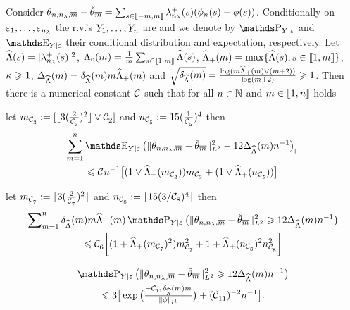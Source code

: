 \begin{lm}\label{au:re:rest}
Consider  
$\hxdfPr-\dxdfPr=\sum_{s\in\nset{-\Di,\Di}}\hfedfmpI[(s)](\hfydf[(s)]-\fydf[(s)])$.
Conditionally on $\rE_1,\dotsc,\rE_{\ssE}$ the r.v.'s
$\rY_1,\dotsc,\rY_{\ssY}$ are \iid and we  denote by $\P_{Y \vert \epsilon}$ and $\E_{Y \vert \epsilon}$ their conditional
 distribution and expectation, respectively. 
Let $\eiSv[(s)]=\vert\hfedfmpI[(s)]\vert^2$,
$\oeiSv=\tfrac{1}{\Di}\sum_{s\in\nset{1,\Di}}\eiSv[(s)]$, $\meiSv=
  \max\{\eiSv[(s)],s\in\nset{1,\Di}\}$, $\cpen\geq1$, $\DiepenSv=\cmeiSv\Di \meiSv$
 and $\sqrt{\cmeiSv}=\tfrac{\log (\Di\meiSv \vee (\Di+2))}{\log(\Di+2)}\geq1$.  Then there is a numerical constant $\cst{}$ such
 that for all $\ssY\in\Nz$ and $\Di\in\nset{1,\ssY}$ holds
  \begin{resListeN}[]
  \item\label{au:re:rest:i} let $\Di_{\cst{3}}:=[\floor{3(\tfrac{2}{\cst{3}})^2}\vee \cst{2}]$ and $\ssY_{\cst{5}}:=15(\tfrac{1}{\cst{5}})^4$ then\\ 
    \begin{multline*}
    \sum_{\Di=1}^{\ssY}\E_{Y\vert \epsilon} \vectp{\VnormLp{\hxdfPr-\dxdfPr}^2 - 12\DiepenSv\ssY^{-1}}\\
 \leq \cst{}\ssY^{-1}\big[(1\vee\meiSv[\Di_{\cst{3}}])\Di_{\cst{3}}+(1\vee\meiSv[\ssY_{\cst{5}}])\big]
 \end{multline*}
  \item\label{au:re:rest:ii} let
    $\Di_{\cst{7}}:=\floor{3(\tfrac{2}{\cst{7}})^2}$ and
    $\ssY_{\cst{8}}:=\floor{15({3/\cst{8}})^4}$ then\\
    \begin{multline*}
    \sum\nolimits_{\Di=1}^{\ssY}\cmeiSv \Di \meiSv\P_{Y \vert \epsilon}\big(\VnormLp{\hxdfPr-\dxdfPr}^2 \geq 12\DiepenSv\ssY^{-1}\big)\\
 \leq\cst{6}\bigg[(1+\meiSv[\Di_{\cst{7}}]^2)\Di_{\cst{7}}^2+1+\meiSv[\ssY_{\cst{8}}]^2\ssY_{\cst{8}}^2\bigg]
 \end{multline*}
  \item\label{au:re:rest:iii}
     \begin{multline*}
 \P_{Y \vert \epsilon}\big(\VnormLp{\hxdfPr-\dxdfPr}^2 \geq 12\DiepenSv\ssY^{-1}\big)\\
 \leq 3 \big[\exp\big(\tfrac{-\cst{11}\cmeiSv\Di}{\Vnormlp[1]{\fydf}}\big)
     +(\cst{11})^{-2}\ssY^{-1}\big].
 \end{multline*}
  \end{resListeN}
\end{lm}

